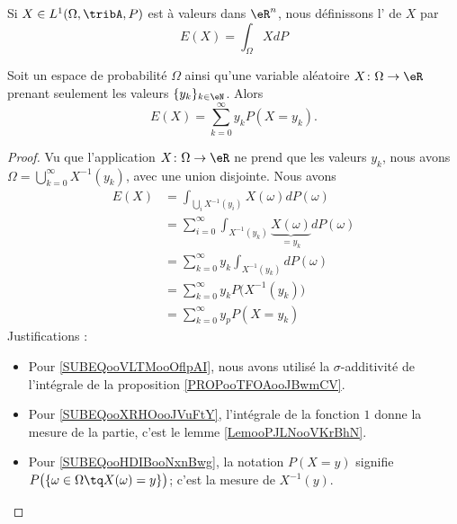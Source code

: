 \begin{definition}      \label{DEFooQKFBooCBZtRG}
    Si \( X\in L^1(\Omega,\tribA,P)\) est à valeurs dans \( \eR^n\), nous définissons l' de \( X\) par
    \begin{equation}        \label{EqdCBLst}
        E(X)=\int_{\Omega}XdP
    \end{equation}
\end{definition}

\begin{lemma}        \label{LEMooEHTYooWmMAgf}
    Soit un espace de probabilité \( \Omega\) ainsi qu'une variable aléatoire \( X\colon \Omega\to \eR\) prenant seulement les valeurs \( \{ y_k \}_{k\in \eN}\). Alors
    \begin{equation}
        E(X)=\sum_{k=0}^{\infty}y_kP(X=y_k).
    \end{equation}
\end{lemma}

\begin{proof}
    Vu que l'application \( X\colon \Omega\to \eR\) ne prend que les valeurs \( y_k\), nous avons \( \Omega=\bigcup_{k=0}^{\infty}X^{-1}(y_k)\), avec une union disjointe. Nous avons
    \begin{subequations}
        \begin{align}
        E(X)&=\int_{\bigcup_iX^{-1}(y_i)}X(\omega)dP(\omega)\\
        &=\sum_{i=0}^{\infty}\int_{X^{-1}(y_k)}\underbrace{X(\omega)}_{=y_k}dP(\omega)      \label{SUBEQooVLTMooOflpAI}\\
        &=\sum_{k=0}^{\infty}y_k\int_{X^{-1}(y_k)}dP(\omega)\\
        &=\sum_{k=0}^{\infty}y_kP\big( X^{-1}(y_k) \big)        \label{SUBEQooXRHOooJVuFtY}\\
        &=\sum_{k=0}^{\infty}y_pP(X=y_k)        \label{SUBEQooHDIBooNxnBwg}
        \end{align}
    \end{subequations}
    Justifications :
    \begin{itemize}
        \item 
            Pour \eqref{SUBEQooVLTMooOflpAI}, nous avons utilisé la \( \sigma\)-additivité de l'intégrale de la proposition \ref{PROPooTFOAooJBwmCV}.
        \item
            Pour \eqref{SUBEQooXRHOooJVuFtY}, l'intégrale de la fonction \( 1\) donne la mesure de la partie, c'est le lemme \ref{LemooPJLNooVKrBhN}.
        \item
            Pour \eqref{SUBEQooHDIBooNxnBwg}, la notation \( P(X=y)\) signifie \( P\big( \{ \omega\in \Omega \tq X(\omega)=y\}\big)\); c'est la mesure de \( X^{-1}(y)\).
    \end{itemize}
\end{proof}

